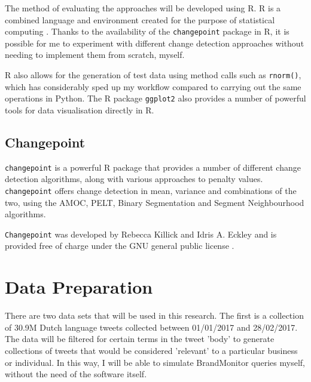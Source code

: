\documentclass{uvamscse}	%
\begin{document}
The method of evaluating the approaches will be developed using \textsf{R}. \textsf{R} is a combined language and environment created for the purpose of statistical computing \cite{RCoreTeam2017}. Thanks to the availability of the \texttt{changepoint} package in \textsf{R}\cite{Killick2014}, it is possible for me to experiment with different change detection approaches without needing to implement them from scratch, myself.

\textsf{R} also allows for the generation of test data using method calls such as \texttt{rnorm()}, which has considerably sped up my workflow compared to carrying out the same operations in Python. The \textsf{R} package \texttt{ggplot2} \cite{Wickham2009} also provides a number of powerful tools for data visualisation directly in \textsf{R}.

\subsection{Changepoint}

\texttt{changepoint} is a powerful R package that provides a number of different change detection algorithms, along with various approaches to penalty values. \texttt{changepoint} offers change detection in mean, variance and combinations of the two, using the AMOC, PELT, Binary Segmentation and Segment Neighbourhood algorithms.

\texttt{Changepoint} was developed by Rebecca Killick and Idris A. Eckley and is provided free of charge under the GNU general public license \cite{Killick2014}.

\section{Data Preparation}

There are two data sets that will be used in this research. The first is a collection of 30.9M Dutch language tweets collected between 01/01/2017 and 28/02/2017. The data will be filtered for certain terms in the tweet 'body' to generate collections of tweets that would be considered 'relevant' to a particular business or individual. In this way, I will be able to simulate BrandMonitor queries myself, without the need of the software itself.

\end{document}

